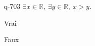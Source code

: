 \begin{truefalse}{q-703}
$\exists x \in \mathbb R,\:\exists y \in \mathbb R,\: x>y$.
\item* Vrai
\item Faux
\end{truefalse}

